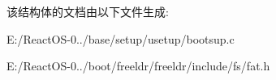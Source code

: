 该结构体的文档由以下文件生成\+:\begin{DoxyCompactItemize}
\item 
E\+:/\+React\+O\+S-\/0../base/setup/usetup/bootsup.\+c\item 
E\+:/\+React\+O\+S-\/0../boot/freeldr/freeldr/include/fs/fat.\+h\end{DoxyCompactItemize}
